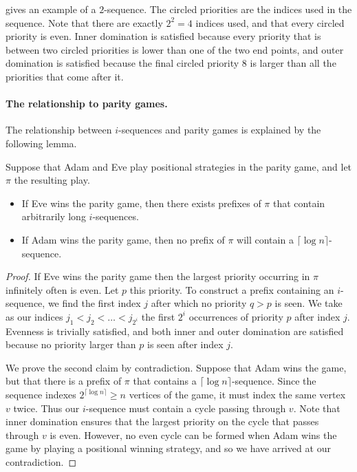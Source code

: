  gives an example of a $2$-sequence. The circled
priorities are the indices used in the sequence. Note that there are exactly
$2^2 = 4$ indices used, and that every circled priority is even. Inner
domination is satisfied because every priority that is between two circled
priorities is lower than one of the two end points, and outer domination is
satisfied because the final circled priority $8$ is larger than all the
priorities that come after it.

\paragraph{\bf The relationship to parity games.}
The relationship between $i$-sequences and parity games is explained by the
following lemma.

\begin{lemma}
\label{3-lem:isequencewin}
Suppose that Adam and Eve play positional strategies in the parity game,
and let $\pi$ the resulting play.
\begin{itemize}
\item If Eve wins the parity game, then there exists prefixes of $\pi$ that
contain arbitrarily long $i$-sequences.
\item If Adam wins the parity game, then no prefix of $\pi$ will contain a
$\lceil \log n \rceil$-sequence.
\end{itemize}
\end{lemma}
\begin{proof}
If Eve wins the parity game then the largest
priority occurring in $\pi$ infinitely often is even. Let $p$ this priority.
To construct a prefix containing an $i$-sequence, we find the first index $j$
after which no priority $q > p$ is seen. We take as our indices $j_1 < j_2 <
\dots < j_{2^i}$ the first $2^i$ occurrences of priority $p$ after index $j$.
Evenness is trivially satisfied, and both inner and outer domination are
satisfied because no priority larger than $p$ is seen after index $j$.

We prove the second claim by contradiction. Suppose that Adam wins the game, but
that there is a prefix of $\pi$ that contains a $\lceil \log n \rceil$-sequence.
Since the sequence indexes $2^{\lceil \log n \rceil} \ge n$ vertices of the
game, it must index the same vertex $v$ twice. Thus our $i$-sequence must
contain a cycle passing through $v$. Note that inner domination ensures that the
largest priority on the cycle that passes through $v$ is even. However, no even
cycle can be formed when Adam wins the game by playing a positional winning
strategy, and so we have arrived at our contradiction.
\end{proof}

